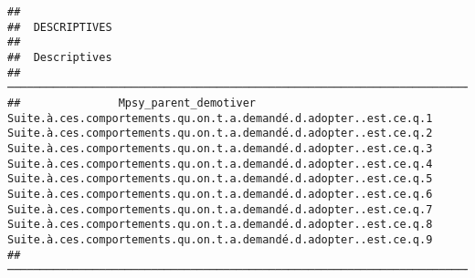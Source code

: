\documentclass[
]{article}
\begin{document}
\begin{verbatim}
## 
##  DESCRIPTIVES
## 
##  Descriptives                                                                                                                                                                                                                                                                                                                                                                                                                                                                                                                                                                                                                                                                      
##  ───────────────────────────────────────────────────────────────────────────────────────────────────────────────────────────────────────────────────────────────────────────────────────────────────────────────────────────────────────────────────────────────────────────────────────────────────────────────────────────────────────────────────────────────────────────────────────────────────────────────────────────────────────────────────────────────────────────────────────────────────────────────────────────────────────────────────────────────────────────────────────────────────────────────────────────────────────────────────────────────────────────────── 
##               Mpsy_parent_demotiver    Suite.à.ces.comportements.qu.on.t.a.demandé.d.adopter..est.ce.q.1    Suite.à.ces.comportements.qu.on.t.a.demandé.d.adopter..est.ce.q.2    Suite.à.ces.comportements.qu.on.t.a.demandé.d.adopter..est.ce.q.3    Suite.à.ces.comportements.qu.on.t.a.demandé.d.adopter..est.ce.q.4    Suite.à.ces.comportements.qu.on.t.a.demandé.d.adopter..est.ce.q.5    Suite.à.ces.comportements.qu.on.t.a.demandé.d.adopter..est.ce.q.6    Suite.à.ces.comportements.qu.on.t.a.demandé.d.adopter..est.ce.q.7    Suite.à.ces.comportements.qu.on.t.a.demandé.d.adopter..est.ce.q.8    Suite.à.ces.comportements.qu.on.t.a.demandé.d.adopter..est.ce.q.9   
##  ───────────────────────────────────────────────────────────────────────────────────────────────────────────────────────────────────────────────────────────────────────────────────────────────────────────────────────────────────────────────────────────────────────────────────────────────────────────────────────────────────────────────────────────────────────────────────────────────────────────────────────────────────────────────────────────────────────────────────────────────────────────────────────────────────────────────────────────────────────────────────────────────────────────────────────────────────────────────────────────────────────────────── 

\end{verbatim}
\end{document}
